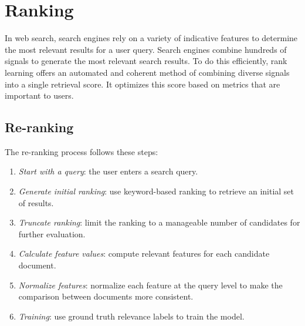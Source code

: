 \section{Ranking}

In web search, search engines rely on a variety of indicative features to determine the most relevant results for a user query.
Search engines combine hundreds of signals to generate the most relevant search results. 
To do this efficiently, rank learning offers an automated and coherent method of combining diverse signals into a single retrieval score. 
It optimizes this score based on metrics that are important to users.

\subsection{Re-ranking}
The re-ranking process follows these steps: 
\begin{enumerate}
    \item \textit{Start with a query}: the user enters a search query.
    \item \textit{Generate initial ranking}: use keyword-based ranking to retrieve an initial set of results.
    \item \textit{Truncate ranking}: limit the ranking to a manageable number of candidates for further evaluation.
    \item \textit{Calculate feature values}: compute relevant features for each candidate document.
    \item \textit{Normalize features}: normalize each feature at the query level to make the comparison between documents more consistent.
    \item \textit{Training}: use ground truth relevance labels to train the model.
\end{enumerate}

